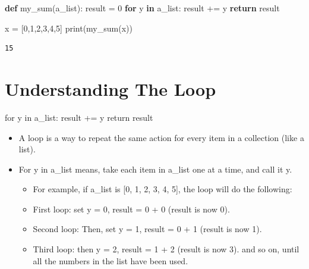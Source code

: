 \documentclass[
  letterpaper,
  DIV=11,
  numbers=noendperiod]{scrreprt}
\newenvironment{Shaded}{\begin{snugshade}}{\end{snugshade}}
\newcommand{\BuiltInTok}[1]{\textcolor[rgb]{0.00,0.23,0.31}{#1}}
\newcommand{\ControlFlowTok}[1]{\textcolor[rgb]{0.00,0.23,0.31}{\textbf{#1}}}
\newcommand{\DecValTok}[1]{\textcolor[rgb]{0.68,0.00,0.00}{#1}}
\newcommand{\KeywordTok}[1]{\textcolor[rgb]{0.00,0.23,0.31}{\textbf{#1}}}
\newcommand{\NormalTok}[1]{\textcolor[rgb]{0.00,0.23,0.31}{#1}}
\newcommand{\OperatorTok}[1]{\textcolor[rgb]{0.37,0.37,0.37}{#1}}
\providecommand{\tightlist}{%
  \setlength{\itemsep}{0pt}\setlength{\parskip}{0pt}}\usepackage{longtable,booktabs,array}
\begin{document}
\begin{Shaded}
\begin{Highlighting}[]
\KeywordTok{def}\NormalTok{ my\_sum(a\_list):}
\NormalTok{    result }\OperatorTok{=} \DecValTok{0}
    \ControlFlowTok{for}\NormalTok{ y }\KeywordTok{in}\NormalTok{ a\_list:}
\NormalTok{        result }\OperatorTok{+=}\NormalTok{ y}
    \ControlFlowTok{return}\NormalTok{ result}
    
\NormalTok{x }\OperatorTok{=}\NormalTok{ [}\DecValTok{0}\NormalTok{,}\DecValTok{1}\NormalTok{,}\DecValTok{2}\NormalTok{,}\DecValTok{3}\NormalTok{,}\DecValTok{4}\NormalTok{,}\DecValTok{5}\NormalTok{]}
\BuiltInTok{print}\NormalTok{(my\_sum(x))}
\end{Highlighting}
\end{Shaded}

\begin{verbatim}
15
\end{verbatim}


\chapter{Understanding The Loop}\label{understanding-the-loop}

\begin{Shaded}
\begin{Highlighting}[]
\NormalTok{for y in a\_list:}
\NormalTok{   result += y}
\NormalTok{return result}
\end{Highlighting}
\end{Shaded}

\begin{itemize}
\tightlist
\item
  A loop is a way to repeat the same action for every item in a
  collection (like a list).
\item
  For y in a\_list means, take each item in a\_list one at a time, and
  call it y.

  \begin{itemize}
  \tightlist
  \item
    For example, if a\_list is {[}0, 1, 2, 3, 4, 5{]}, the loop will do
    the following:
  \item
    First loop: set y = 0, result = 0 + 0 (result is now 0).
  \item
    Second loop: Then, set y = 1, result = 0 + 1 (result is now 1).
  \item
    Third loop: then y = 2, result = 1 + 2 (result is now 3). and so on,
    until all the numbers in the list have been used.
  \end{itemize}
\end{itemize}
\end{document}
